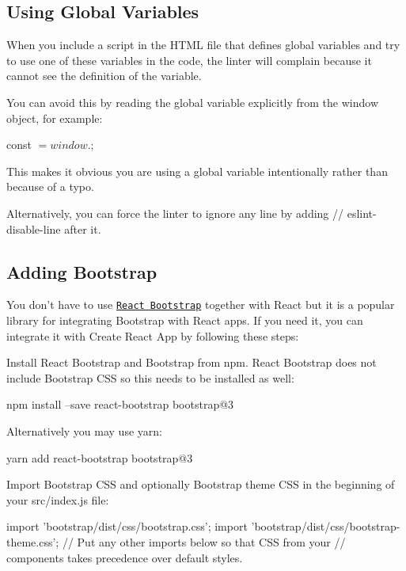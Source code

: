\subsection*{Using Global Variables}

When you include a script in the H\+T\+ML file that defines global variables and try to use one of these variables in the code, the linter will complain because it cannot see the definition of the variable.

You can avoid this by reading the global variable explicitly from the {\ttfamily window} object, for example\+:


\begin{DoxyCode}
const $ = window.$;
\end{DoxyCode}


This makes it obvious you are using a global variable intentionally rather than because of a typo.

Alternatively, you can force the linter to ignore any line by adding {\ttfamily // eslint-\/disable-\/line} after it.

\subsection*{Adding Bootstrap}

You don’t have to use \href{https://react-bootstrap.github.io}{\tt React Bootstrap} together with React but it is a popular library for integrating Bootstrap with React apps. If you need it, you can integrate it with Create React App by following these steps\+:

Install React Bootstrap and Bootstrap from npm. React Bootstrap does not include Bootstrap C\+SS so this needs to be installed as well\+:


\begin{DoxyCode}
npm install --save react-bootstrap bootstrap@3
\end{DoxyCode}


Alternatively you may use {\ttfamily yarn}\+:


\begin{DoxyCode}
yarn add react-bootstrap bootstrap@3
\end{DoxyCode}


Import Bootstrap C\+SS and optionally Bootstrap theme C\+SS in the beginning of your {\ttfamily src/index.\+js} file\+:


\begin{DoxyCode}
import 'bootstrap/dist/css/bootstrap.css';
import 'bootstrap/dist/css/bootstrap-theme.css';
// Put any other imports below so that CSS from your
// components takes precedence over default styles.
\end{DoxyCode}


